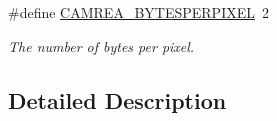 \begin{DoxyCompactItemize}
\mbox{\label{group___c_a_m_e_r_a___m_o_d_u_l_e___private___defines_ga5c22b32d7b7345168848726f8b585efc}} 
\#define \hyperlink{group___c_a_m_e_r_a___m_o_d_u_l_e___private___defines_ga5c22b32d7b7345168848726f8b585efc}{C\+A\+M\+R\+E\+A\+\_\+\+B\+Y\+T\+E\+S\+P\+E\+R\+P\+I\+X\+EL}~2
\begin{DoxyCompactList}\small\item\em The number of bytes per pixel. \end{DoxyCompactList}\end{DoxyCompactItemize}


\subsection{Detailed Description}
